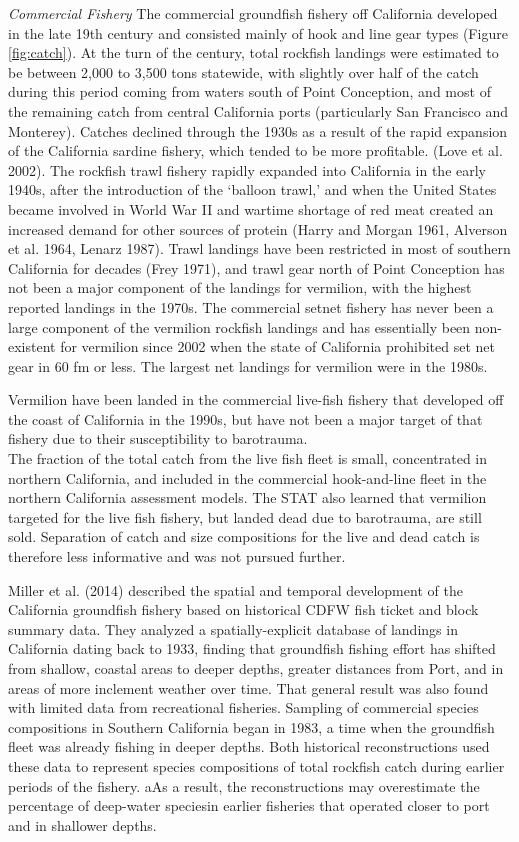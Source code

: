 \documentclass[
  english,
  a4paper,
]{article}
\begin{document}
\emph{Commercial Fishery}
The commercial groundfish fishery off California developed in the late 19th century and consisted mainly of hook and line gear types (Figure \ref{fig:catch}). At the turn of the century, total rockfish landings were estimated to be between 2,000 to 3,500 tons statewide, with slightly over half of the catch during this period coming from waters south of Point Conception, and most of the remaining catch from central California ports (particularly San Francisco and Monterey). Catches declined through the 1930s as a result of the rapid expansion of the California sardine fishery, which tended to be more profitable.
(Love et al. 2002). The rockfish trawl fishery rapidly expanded into California in the early 1940s, after the introduction of the `balloon trawl,' and when the United States became involved in World War II and wartime shortage of red
meat created an increased demand for other sources of protein (Harry and Morgan 1961, Alverson et al. 1964, Lenarz 1987). Trawl landings have been restricted in most of southern California for decades (Frey 1971), and trawl gear north of Point Conception has not been a major component of the landings for vermilion, with the highest reported landings in the 1970s. The commercial setnet fishery has never been a large component of the vermilion rockfish landings and has essentially been non-existent for vermilion since 2002 when the state of California prohibited set net gear in 60 fm or less. The largest net landings for vermilion were in the 1980s.

Vermilion have been landed in the commercial live-fish fishery that developed off the coast of
California in the 1990s, but have not been a major target of that fishery due to their susceptibility to barotrauma.\\
The fraction of the total catch
from the live fish fleet is small, concentrated in northern California, and included in the commercial hook-and-line
fleet in the northern California assessment models. The STAT also learned that vermilion
targeted for the live fish fishery, but landed
dead due to barotrauma, are still sold. Separation of catch and size compositions for the live and dead catch is therefore less informative and was not pursued further.

Miller et al. (2014) described the spatial and temporal development of the
California groundfish fishery based on historical CDFW fish ticket and block summary data. They analyzed a spatially-explicit database of
landings in California dating back to 1933, finding that groundfish fishing effort
has shifted from shallow, coastal areas to deeper depths, greater distances from
Port, and in areas of more inclement weather over time. That general result was also found with limited data from recreational fisheries. Sampling of commercial species compositions in Southern California
began in 1983, a time when the groundfish fleet was already fishing in deeper depths.
Both historical reconstructions used these data to represent species compositions of
total rockfish catch during earlier periods of the fishery. aAs a result, the reconstructions may
overestimate the percentage of deep-water speciesin earlier fisheries that operated closer
to port and in shallower depths.
\end{document}
